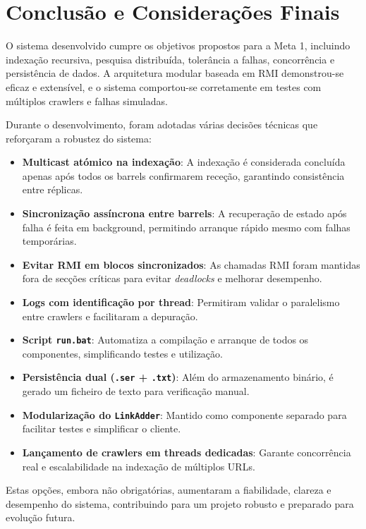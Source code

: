 \documentclass{article}
\begin{document}
\newpage
\section{Conclusão e Considerações Finais}

O sistema desenvolvido cumpre os objetivos propostos para a Meta 1, incluindo indexação recursiva, pesquisa distribuída, tolerância a falhas, concorrência e persistência de dados. A arquitetura modular baseada em RMI demonstrou-se eficaz e extensível, e o sistema comportou-se corretamente em testes com múltiplos crawlers e falhas simuladas.

Durante o desenvolvimento, foram adotadas várias decisões técnicas que reforçaram a robustez do sistema:

\begin{itemize}
    \item \textbf{Multicast atómico na indexação}: A indexação é considerada concluída apenas após todos os barrels confirmarem receção, garantindo consistência entre réplicas.

    \item \textbf{Sincronização assíncrona entre barrels}: A recuperação de estado após falha é feita em background, permitindo arranque rápido mesmo com falhas temporárias.

    \item \textbf{Evitar RMI em blocos sincronizados}: As chamadas RMI foram mantidas fora de secções críticas para evitar \textit{deadlocks} e melhorar desempenho.

    \item \textbf{Logs com identificação por thread}: Permitiram validar o paralelismo entre crawlers e facilitaram a depuração.

    \item \textbf{Script \texttt{run.bat}}: Automatiza a compilação e arranque de todos os componentes, simplificando testes e utilização.

    \item \textbf{Persistência dual (\texttt{.ser} + \texttt{.txt})}: Além do armazenamento binário, é gerado um ficheiro de texto para verificação manual.

    \item \textbf{Modularização do \texttt{LinkAdder}}: Mantido como componente separado para facilitar testes e simplificar o cliente.

    \item \textbf{Lançamento de crawlers em threads dedicadas}: Garante concorrência real e escalabilidade na indexação de múltiplos URLs.
\end{itemize}

Estas opções, embora não obrigatórias, aumentaram a fiabilidade, clareza e desempenho do sistema, contribuindo para um projeto robusto e preparado para evolução futura.
\end{document}
